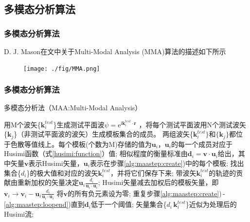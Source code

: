 \documentclass[UTF8]{beamer}
\begin{document}
\subsection{多模态分析算法}
\begin{frame}
    \frametitle{多模态分析算法}
    D. J. Mason在文中\cite{mason2012extending}\cite{mason2013quantum}关于Multi-Modal Analysis (MMA)算法的描述如下所示
    \begin{figure}
        \centering
        \texttt{[image: ./fig/MMA.png]}
    \end{figure}
\end{frame}
\begin{frame}
    \frametitle{多模态分析算法}
    \begin{algorithm}[H]
        \caption{多模态分析法（MAA:Multi-Modal Analysis）}
        \label{alg:maa}
        \begin{algorithmic}[1]
            \STATE 用M个波矢\{$\mathbf{k}^{test}_{i}$\}生成测试平面波$\psi=\mathrm{e}^{\mathrm{i}\mathbf{k}_i^{test}\cdot\mathbf{r}}$ ，将每个测试平面波用N个测试波矢\{$\mathbf{k}_j$\}（非测试平面波的波矢）生成模板集合的成员。
            两组波矢\{$\mathbf{k}_{i}^{test}\}$和$\{\mathbf{k}_{j}\}$都位于色散等值线上。每个模板(个数为M)存储的值为$\mathbf{u}_i$，$\mathbf{u}_i$的每一个成员对应于Husimi函数（式\ref{husimi:function}）值;
            \label{alg:maastep:create}
            \STATE 相似程度的衡量标准由$\mathbf{d}_i=\mathbf{v}\cdot\mathbf{u}_i$给出，其中矢量$\mathbf{v}$表示Husimi矢量，$\mathbf{u}_i$表示在步骤\ref{alg:maastep:create})中的每个模板;
            \STATE 找出集合\{$d_i$\}的极大值和对应的波矢$\mathbf{k}^{test}_i$，并将它们保存下来;
            \STATE 带波矢$\mathbf{k}^{test}_{i}$的轨迹的贡献由重新加权的矢量决定$\mathbf{u}_{i}\frac{d_{i}}{\mathbf{u}_{i}\cdot\mathbf{u}_{i}}$;
            \STATE Husimi矢量减去加权后的模板矢量，即$\mathbf{v}_{i}\rightarrow\mathbf{v}_{i}-\mathbf{u}_{i}\frac{d_{i}}{\mathbf{u}_{i}\cdot\mathbf{u}_{i}}$
            \STATE 将$\mathbf{v}$的所有负元素设为零;
            \label {alg:maastep:loopend}
            \STATE 重复步骤\ref{alg:maastep:create})\,-\,\ref{alg:maastep:loopend})直到$\mathbf{d}_{i}$低于一个阈值;
            \STATE 矢量集合\{$d_{i}\,\mathbf{k}^{test}_i$\}近似为处理后的Husimi流;
        \end{algorithmic}
    \end{algorithm}
\end{frame}
\end{document}
